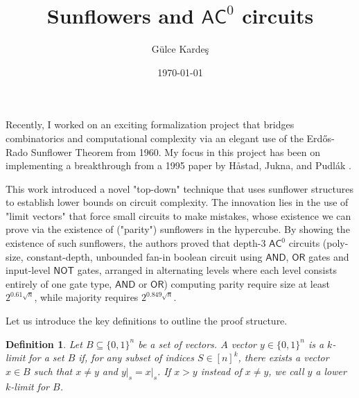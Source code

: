 \documentclass[a4, 12pt]{article}
\title{Sunflowers and $\mathsf{AC}^0$ circuits}
\author{Gülce Kardeş
}
\date{\today}
\newtheorem{definition}{Definition}
\begin{document}
\maketitle
Recently, I worked on an exciting formalization project that bridges combinatorics and computational complexity via an elegant use of the Erdős-Rado Sunflower Theorem from 1960.
My focus in this project has been on implementing a breakthrough from a 1995 paper by Håstad, Jukna, and Pudlák \cite{Hstad1995}.

This work introduced a novel "top-down" technique that uses sunflower structures to establish lower bounds on circuit complexity. The innovation lies in the use of "limit vectors" that force small circuits to make mistakes, whose existence we can prove via the existence of ("parity") sunflowers in the hypercube. By showing the existence of such sunflowers, the authors proved that depth-3 $\mathsf{AC}^0$ circuits (poly-size, constant-depth, unbounded fan-in boolean circuit using $\mathsf{AND}$, $\mathsf{OR}$ gates and input-level $\mathsf{NOT}$ gates, arranged in alternating levels where each level consists entirely of one gate type, $\mathsf{AND}$ or $\mathsf{OR}$) computing parity require size at least $2^{0.61\sqrt{n}}$, while majority requires $2^{0.849\sqrt{n}}$. 

Let us introduce the key definitions to outline the proof structure.
\begin{definition}
Let $B \subseteq\{0,1\}^n$ be a set of vectors. $A$ vector $y \in\{0,1\}^n$ is a $k$-limit for a set $B$ if, for any subset of indices $S \in[n]^k$, there exists a vector $x \in B$ such that $x \neq y$ and $\left.y\right|_s=\left.x\right|_s$. If $x>y$ instead of $x \neq y$, we call $y$ a lower $k$-limit for $B$.  
\end{definition} 
\end{document}

